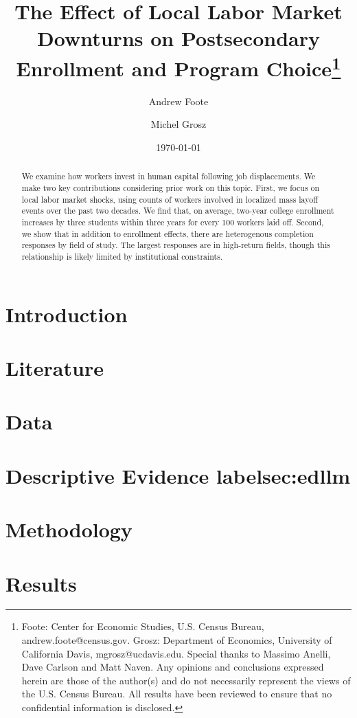 \documentclass[11pt,letterpaper]{article}
\title{The Effect of Local Labor Market Downturns on Postsecondary Enrollment and Program Choice\thanks{ Foote: Center for Economic Studies, U.S. Census Bureau, andrew.foote@census.gov. Grosz: Department of Economics, University of California Davis, mgrosz@ucdavis.edu. Special thanks to Massimo Anelli,  Dave Carlson and Matt Naven. Any opinions and conclusions expressed herein are those of the author(s) and do not necessarily represent the views of the U.S. Census Bureau. All results have been reviewed to ensure that no confidential information is disclosed.}}
\date{\today\\  }
\author[1]{Andrew Foote}
\author[2]{Michel Grosz}
\affil[1]{Center for Economic Studies, U.S. Census Bureau}
\affil[2]{Department of Economics, University of California, Davis}
\begin{document}
\begin{abstract}

We examine how workers invest in human capital following job displacements. We make two key contributions considering prior work on this topic. First, we focus on local labor market shocks, using counts of workers involved in localized mass layoff events over the past two decades.  We find that, on average, two-year college enrollment increases by three students within three years for every 100 workers laid off. Second, we show that in addition to enrollment effects, there are heterogenous completion responses by field of study. The largest responses are in high-return fields, though this relationship is likely limited by institutional constraints.

\end{abstract}


\doublespacing
\clearpage 

\section{Introduction}


\section{Literature \label{sec:literature}}


\section{Data \label{sec:data}}


\section{Descriptive Evidence label{sec:edllm}}



\section{Methodology \label{sec:meth}}

 

\section{Results \label{sec:results}}
\end{document}
